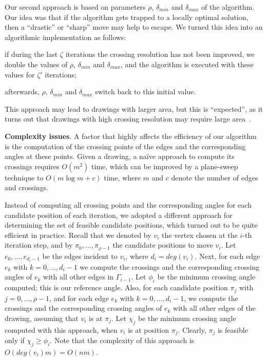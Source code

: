 \documentclass[runningheads]{llncs}
\newcommand{\myparagraph}[1]{\smallskip\noindent\textbf{#1}.}
\begin{document}
Our second approach is based on parameters $\rho$, $\delta_{min}$ and $\delta_{max}$ of the algorithm. Our idea was that if the algorithm gets trapped to a locally optimal solution, then a ``drastic'' or ``sharp'' move may help to escape. We turned this idea into an algorithmic implementation as follows:
%
\begin{inparaenum}[(i)]
\item if during the last $\zeta$ iterations the crossing resolution has not been improved, we double the values of $\rho$, $\delta_{min}$ and $\delta_{max}$, and the algorithm is executed with these values for $\zeta'$ iterations;
\item afterwards, $\rho$, $\delta_{min}$ and $\delta_{max}$ switch back to this initial value.
\end{inparaenum}
%
This approach may lead to drawings with larger area, but this is ``expected'', as it turns out that drawings with high crossing resolution may require large area~\cite{DBLP:journals/jgaa/AngeliniCDFBKS11,DBLP:journals/tcs/BrandenburgDEKL16}.

\myparagraph{Complexity issues}
%
A factor that highly affects the efficiency of our algorithm is the computation of the crossing points of the edges and the corresponding angles at these points. Given  a drawing, a na\"ive approach to compute its crossings requires $O(m^2)$ time, which can be improved by a plane-sweep technique to $O(m \log m + c)$ time, where $m$ and $c$ denote the number of edges and crossings.

Instead of computing all crossing points and the corresponding angles for each candidate position of each iteration, we adopted a different approach for determining the set of feasible candidate positions, which turned out to be quite efficient in practice. Recall that we denoted by $v_i$ the vertex chosen at the $i$-th iteration step, and by $\pi_0,\ldots,\pi_{\rho-1}$ the candidate positions to move $v_i$. Let $e_0,\ldots,e_{d_i-1}$ be the edges incident to $v_i$, where $d_i=deg(v_i)$. Next, for each edge $e_k$ with $k=0,\ldots,d_i-1$  we compute the crossings and the corresponding crossing angles of $e_k$ with all other edges in $\Gamma_{i-1}$. Let $\phi_i$ be the minimum crossing angle computed; this is our reference angle. Also, for each candidate position $\pi_j$ with $j=0,\ldots,\rho-1$, and for each edge $e_k$ with $k=0,\ldots,d_i-1$, we compute the crossings and the corresponding crossing angles of $e_k$ with all other edges of the drawing, assuming that $v_i$ is at $\pi_j$. Let $\chi_j$ be the minimum crossing angle computed with this approach, when $v_i$ is at position $\pi_j$. Clearly, $\pi_j$ is feasible only if $\chi_j \geq \phi_i$. Note that the complexity of this approach is $O(deg(v_i)m) = O(nm)$.
\end{document}
